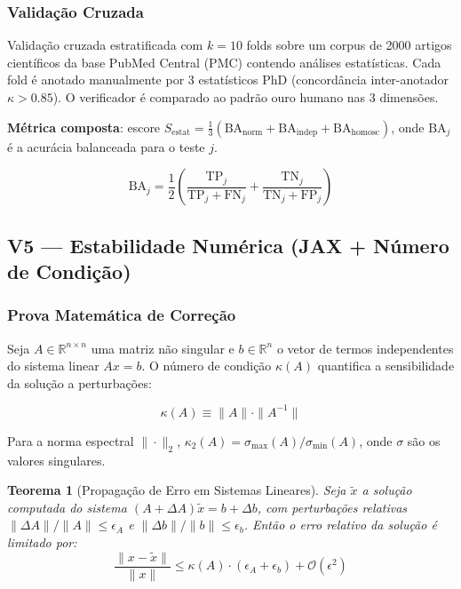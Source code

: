 \documentclass[5p]{elsarticle}
\newtheorem{theorem}{Teorema}[section]
\theoremstyle{remark}
\begin{document}
\subsubsection{Validação Cruzada}

Validação cruzada estratificada com $k = 10$ folds sobre um corpus de 2000 artigos científicos da base PubMed Central (PMC) contendo análises estatísticas. Cada fold é anotado manualmente por 3 estatísticos PhD (concordância inter-anotador $\kappa > 0.85$). O verificador é comparado ao padrão ouro humano nas 3 dimensões.

\textbf{Métrica composta}: escore $S_{\text{estat}} = \frac{1}{3}(\text{BA}_{\text{norm}} + \text{BA}_{\text{indep}} + \text{BA}_{\text{homosc}})$, onde $\text{BA}_j$ é a acurácia balanceada para o teste $j$.

\begin{equation}
\text{BA}_j = \frac{1}{2}\left( \frac{\text{TP}_j}{\text{TP}_j + \text{FN}_j} + \frac{\text{TN}_j}{\text{TN}_j + \text{FP}_j} \right)
\label{eq:c4_balanced}
\end{equation}

\subsection{V5 --- Estabilidade Numérica (JAX + Número de Condição)}

\subsubsection{Prova Matemática de Correção}

Seja $A \in \mathbb{R}^{n \times n}$ uma matriz não singular e $b \in \mathbb{R}^n$ o vetor de termos independentes do sistema linear $Ax = b$. O número de condição $\kappa(A)$ quantifica a sensibilidade da solução a perturbações:

\begin{equation}
\kappa(A) \equiv \|A\| \cdot \|A^{-1}\|
\label{eq:c5_kappa}
\end{equation}

Para a norma espectral $\|\cdot\|_2$, $\kappa_2(A) = \sigma_{\max}(A) / \sigma_{\min}(A)$, onde $\sigma$ são os valores singulares.

\begin{theorem}[Propagação de Erro em Sistemas Lineares]
Seja $\tilde{x}$ a solução computada do sistema $(A + \Delta A)\tilde{x} = b + \Delta b$, com perturbações relativas $\|\Delta A\|/\|A\| \leq \epsilon_A$ e $\|\Delta b\|/\|b\| \leq \epsilon_b$. Então o erro relativo da solução é limitado por:
\begin{equation}
\frac{\|x - \tilde{x}\|}{\|x\|} \leq \kappa(A) \cdot (\epsilon_A + \epsilon_b) + \mathcal{O}(\epsilon^2)
\label{eq:c5_errorbound}
\end{equation}
\end{theorem}
\end{document}
